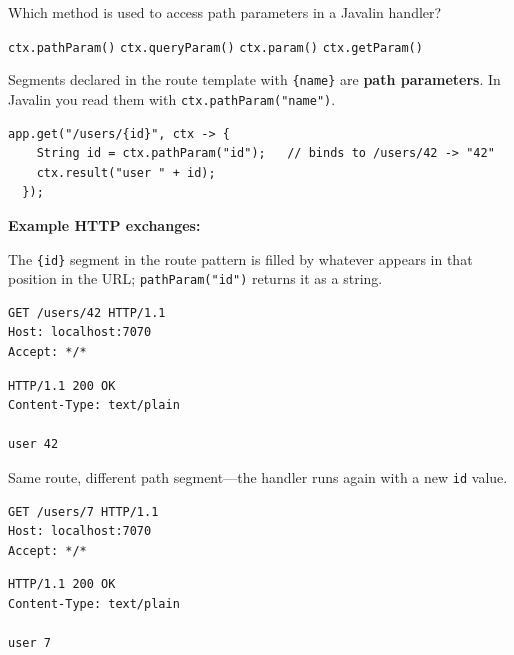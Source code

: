 \question[4]
Which method is used to access path parameters in a Javalin handler?
\begin{choices}
  \CorrectChoice \texttt{ctx.pathParam()}
  \choice \texttt{ctx.queryParam()}
  \choice \texttt{ctx.param()}
  \choice \texttt{ctx.getParam()}
\end{choices}
\begin{solution}
  Segments declared in the route template with \texttt{\{name\}} are \textbf{path parameters}. In Javalin you read them with \texttt{ctx.pathParam("name")}.

  \begin{lstlisting}[style=java] 
  app.get("/users/{id}", ctx -> {
    String id = ctx.pathParam("id");   // binds to /users/42 -> "42"
    ctx.result("user " + id);
  });
  \end{lstlisting}

  \noindent\textbf{Example HTTP exchanges:}\par
  \noindent The \texttt{\{id\}} segment in the route pattern is filled by whatever appears in that position in the URL; \texttt{pathParam("id")} returns it as a string.\par
  \begin{httpexchange}
\begin{lstlisting}[style=http]
GET /users/42 HTTP/1.1
Host: localhost:7070
Accept: */*

\end{lstlisting}
\httpmidarrows
\begin{lstlisting}[style=http]
HTTP/1.1 200 OK
Content-Type: text/plain

user 42
\end{lstlisting}
  \end{httpexchange}

  \noindent Same route, different path segment---the handler runs again with a new \texttt{id} value.\par
  \begin{httpexchange}
\begin{lstlisting}[style=http]
GET /users/7 HTTP/1.1
Host: localhost:7070
Accept: */*

\end{lstlisting}
\httpmidarrows
\begin{lstlisting}[style=http]
HTTP/1.1 200 OK
Content-Type: text/plain

user 7
\end{lstlisting}
  \end{httpexchange}


\end{solution}
